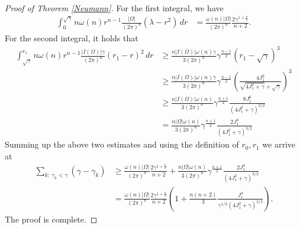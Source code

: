 \documentclass[11pt,twoside, leqno]{article}
\numberwithin{equation}{section}
\begin{document}
\begin{proof}[Proof of Theorem \ref{Neumann}]
For the first integral, we have
\begin{align*}
\int_0^{\sqrt\gamma}  {n}{\omega(n) r^{n-1} } \frac{|\Omega|}{(2\pi)^{n}}{(\lambda-r^2)}\,dr&=\frac{\omega(n)|\Omega|}{(2\pi)^{n}} \frac{2\gamma^{1+\frac n2}}{n+2}.
\end{align*}
For the second integral, it holds that
\begin{align*}
\int_{\sqrt\gamma}^{r_1} {n}{\omega(n) r^{n-1} } \frac{|I(\Omega)|\gamma}{(2\pi)^{n}}\left(r_1-r\right)^2\,dr
&\ge \frac{n|I(\Omega)|\omega(n) \gamma}{3(2\pi)^{n}} \gamma^{\frac{n-1}{2}} \left(r_1-\sqrt\gamma\right)^3\\
&\ge  \frac{n|I(\Omega)|\omega(n) \gamma}{3(2\pi)^{n}} \gamma^{\frac{n-1}{2}}  \left(\frac{4J_1^2}{\sqrt{4J_1^2+\gamma}+\sqrt\gamma}\right)^3\\
&\ge \frac{n|I(\Omega)|\omega(n) }{3(2\pi)^{n}} \gamma^{\frac{n+1}{2}} \frac{8J_1^6}{(4J_1^2+\gamma)^{3/2}} \\
&= \frac{n|\Omega|\omega(n) }{3(2\pi)^{n}} \gamma^{\frac{n+1}{2}} \frac{2J_1^4}{(4J_1^2+\gamma)^{3/2}}
\end{align*}
Summing up the above two estimates and using the definition of $r_0,r_1$ we arrive at
\begin{align*}
\sum_{k:\,\gamma_k<\gamma} (\gamma-\gamma_k)&\ge \frac{\omega(n)|\Omega|}{(2\pi)^{n}} \frac{2\gamma^{1+\frac n2}}{n+2}+  \frac{n|\Omega|\omega(n) }{3(2\pi)^{n}} \gamma^{\frac{n+1}{2}} \frac{2J_1^4}{(4J_1^2+\gamma)^{3/2}}\\
&=\frac{\omega(n)|\Omega|}{(2\pi)^{n}} \frac{2\gamma^{1+\frac n2}}{n+2}\left(1+\frac{n(n+2) }{3 } \frac{J_1^4}{\gamma^{1/2} (4J_1^2+\gamma)^{3/2}}\right).
\end{align*}
The proof is complete.
\end{proof}
\end{document}
